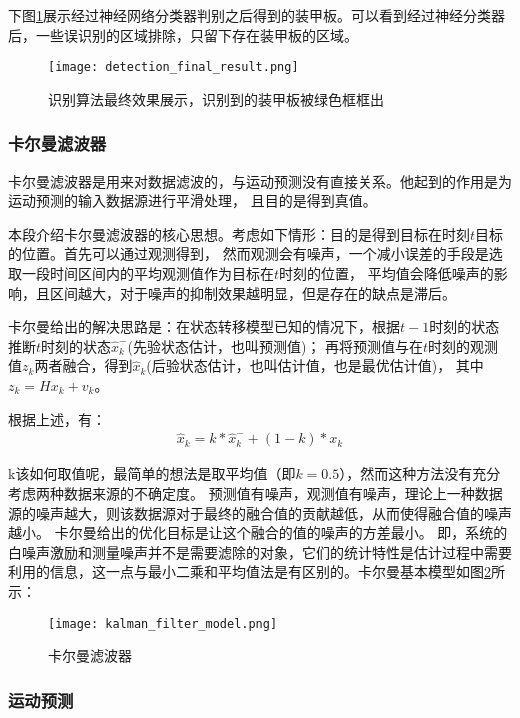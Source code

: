 下图\ref{识别算法最终效果展示}展示经过神经网络分类器判别之后得到的装甲板。可以看到经过神经分类器后，一些误识别的区域排除，只留下存在装甲板的区域。
\begin{figure}[H]
    \centering
    \texttt{[image: detection\_final\_result.png]} 
    \caption{识别算法最终效果展示，识别到的装甲板被绿色框框出} 
    \label{识别算法最终效果展示}
\end{figure}

\subsubsection{卡尔曼滤波器}
卡尔曼滤波器\cite{welch1995introduction}是用来对数据滤波的，与运动预测没有直接关系。他起到的作用是为运动预测的输入数据源进行平滑处理，
且目的是得到真值。\par

本段介绍卡尔曼滤波器的核心思想。考虑如下情形：目的是得到目标在时刻$t$目标的位置。首先可以通过观测得到，
然而观测会有噪声，一个减小误差的手段是选取一段时间区间内的平均观测值作为目标在$t$时刻的位置，
平均值会降低噪声的影响，且区间越大，对于噪声的抑制效果越明显，但是存在的缺点是滞后。\par

卡尔曼给出的解决思路是：在状态转移模型已知的情况下，根据$t-1$时刻的状态推断$t$时刻的状态$\hat{x}_k^{-}$(先验状态估计，也叫预测值)；
再将预测值与在$t$时刻的观测值$z_k$两者融合，得到$\hat{x}_k$(后验状态估计，也叫估计值，也是最优估计值)，
其中$z_k=Hx_k+v_k$。\par

根据上述，有：
\begin{gather}
    \hat{x}_k = k*\hat{x}_k^{-} + (1-k)*x_k
\end{gather}

k该如何取值呢，最简单的想法是取平均值（即$k=0.5$），然而这种方法没有充分考虑两种数据来源的不确定度。
预测值有噪声，观测值有噪声，理论上一种数据源的噪声越大，则该数据源对于最终的融合值的贡献越低，从而使得融合值的噪声越小。
卡尔曼给出的优化目标是让这个融合的值的噪声的方差最小。
即，系统的白噪声激励和测量噪声并不是需要滤除的对象，它们的统计特性是估计过程中需要利用的信息，这一点与最小二乘和平均值法是有区别的。卡尔曼基本模型如图\ref{卡尔曼滤波器}所示：
\begin{figure}[H]
    \centering
    \texttt{[image: kalman\_filter\_model.png]} 
    \caption{卡尔曼滤波器} 
    \label{卡尔曼滤波器} 
\end{figure} 

\subsubsection{运动预测}


